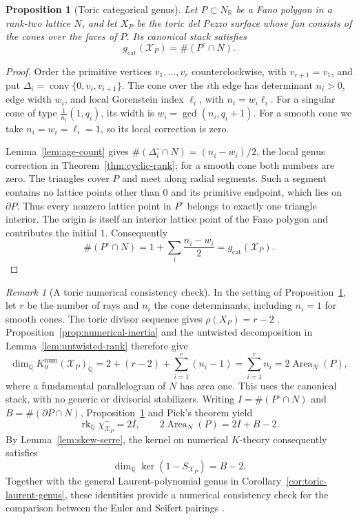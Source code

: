 \documentclass[11pt]{article}
\theoremstyle{plain}
\newtheorem{proposition}[theorem]{Proposition}
\theoremstyle{definition}
\theoremstyle{remark}
\newtheorem{remark}[theorem]{Remark}
\newcommand{\rk}{\operatorname{rk}}
\newcommand{\Q}{\mathbb Q}
\newcommand{\1}{\mathbf 1}
\begin{document}
\begin{proposition}[Toric categorical genus]\label{prop:toric-categorical-genus}
Let $P\subset N_{\mathbb R}$ be a Fano polygon in a rank-two lattice $N$, and let $X_P$ be the toric del Pezzo surface whose fan consists of the cones over the faces of $P$.  Its canonical stack satisfies
\begin{equation}\label{eq:toric-categorical-genus}
\boxed{g_{\mathrm{cat}}(\mathcal X_P)=\#(P^\circ\cap N).}
\end{equation}
\end{proposition}

\begin{proof}
Order the primitive vertices $v_1,\dots,v_r$ counterclockwise, with $v_{r+1}=v_1$, and put $\Delta_i=\operatorname{conv}\{0,v_i,v_{i+1}\}$.  The cone over the $i$th edge has determinant $n_i>0$, edge width $w_i$, and local Gorenstein index $\ell_i$, with $n_i=w_i\ell_i$.  For a singular cone of type $\frac1{n_i}(1,q_i)$, its width is $w_i=\gcd(n_i,q_i+1)$.  For a smooth cone we take $n_i=w_i=\ell_i=1$, so its local correction is zero.

Lemma~\ref{lem:age-count} gives $\#(\Delta_i^\circ\cap N)=(n_i-w_i)/2$, the local genus correction in Theorem~\ref{thm:cyclic-rank}; for a smooth cone both numbers are zero.  The triangles cover $P$ and meet along radial segments.  Such a segment contains no lattice points other than $0$ and its primitive endpoint, which lies on $\partial P$.  Thus every nonzero lattice point in $P^\circ$ belongs to exactly one triangle interior.  The origin is itself an interior lattice point of the Fano polygon and contributes the initial $1$.  Consequently
\[
\#(P^\circ\cap N)
=1+\sum_i\frac{n_i-w_i}{2}
=g_{\mathrm{cat}}(\mathcal X_P).
\]
\end{proof}

\begin{remark}[A toric numerical consistency check]\label{rem:toric-numerical-check}
In the setting of Proposition~\ref{prop:toric-categorical-genus}, let $r$ be the number of rays and $n_i$ the cone determinants, including $n_i=1$ for smooth cones.  The toric divisor sequence gives $\rho(X_P)=r-2$ \cite[Theorem 4.1.3 and Proposition 4.2.7]{CLS}.  Proposition~\ref{prop:numerical-inertia} and the untwisted decomposition in Lemma~\ref{lem:untwisted-rank} therefore give
\[
\dim_{\Q}K_0^{\mathrm{num}}(\mathcal X_P)_{\Q}
=2+(r-2)+\sum_{i=1}^r(n_i-1)
=\sum_{i=1}^r n_i=2\operatorname{Area}_N(P),
\]
where a fundamental parallelogram of $N$ has area one.  This uses the canonical stack, with no generic or divisorial stabilizers.  Writing $I=\#(P^\circ\cap N)$ and $B=\#(\partial P\cap N)$, Proposition~\ref{prop:toric-categorical-genus} and Pick's theorem yield
\[
\rk_{\Q}\chi^-_{\mathcal X_P}=2I,
\qquad
2\operatorname{Area}_N(P)=2I+B-2.
\]
By Lemma~\ref{lem:skew-serre}, the kernel on numerical $K$-theory consequently satisfies
\[
\dim_{\Q}\ker(1-S_{\mathcal X_P})=B-2.
\]
Together with the general Laurent-polynomial genus in Corollary~\ref{cor:toric-laurent-genus}, these identities provide a numerical consistency check for the comparison between the Euler and Seifert pairings \cite[Sections 4.2 and 5]{HarderThompson}.
\end{remark}
\end{document}
